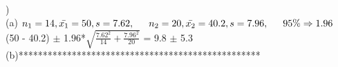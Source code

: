 \documentclass[12pt]{article}
\begin{document}
\noindent \hrulefill \\


) \\
\indent (a) $n_1 = 14, \bar{x_1} = 50, s = 7.62, \indent n_2 = 20, \bar{x_2} = 40.2, s = 7.96, \indent 95\% \Rightarrow 1.96$\\
\indent \indent (50 - 40.2) $\pm$ 1.96*{\Large $\sqrt{\frac{7.62^2}{14} + \frac{7.96^2}{20}}$} = 9.8 $\pm$ 5.3\\
\indent (b)**************************************************
\end{document}
